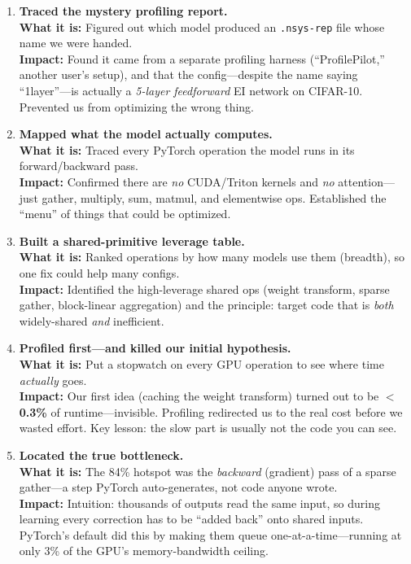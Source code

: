 \documentclass[11pt]{article}
\newcommand{\what}[1]{\textbf{What it is:} #1}
\newcommand{\impact}[1]{\textbf{Impact:} #1}
\begin{document}
\begin{enumerate}[leftmargin=*]

\item \textbf{Traced the mystery profiling report.}\\
\what{Figured out which model produced an \texttt{.nsys-rep} file whose name we were handed.}\\
\impact{Found it came from a separate profiling harness (``ProfilePilot,'' another user's
setup), and that the config---despite the name saying ``1layer''---is actually a
\emph{5-layer feedforward} EI network on CIFAR-10. Prevented us from optimizing the wrong thing.}

\item \textbf{Mapped what the model actually computes.}\\
\what{Traced every PyTorch operation the model runs in its forward/backward pass.}\\
\impact{Confirmed there are \emph{no} CUDA/Triton kernels and \emph{no} attention---just
gather, multiply, sum, matmul, and elementwise ops. Established the ``menu'' of things that
could be optimized.}

\item \textbf{Built a shared-primitive leverage table.}\\
\what{Ranked operations by how many models use them (breadth), so one fix could help many configs.}\\
\impact{Identified the high-leverage shared ops (weight transform, sparse gather, block-linear
aggregation) and the principle: target code that is \emph{both} widely-shared \emph{and}
inefficient.}

\item \textbf{Profiled first---and killed our initial hypothesis.}\\
\what{Put a stopwatch on every GPU operation to see where time \emph{actually} goes.}\\
\impact{Our first idea (caching the weight transform) turned out to be \textbf{$<$0.3\%} of
runtime---invisible. Profiling redirected us to the real cost before we wasted effort. Key
lesson: the slow part is usually not the code you can see.}

\item \textbf{Located the true bottleneck.}\\
\what{The 84\% hotspot was the \emph{backward} (gradient) pass of a sparse gather---a step
PyTorch auto-generates, not code anyone wrote.}\\
\impact{Intuition: thousands of outputs read the same input, so during learning every
correction has to be ``added back'' onto shared inputs. PyTorch's default did this by making
them queue one-at-a-time---running at only 3\% of the GPU's memory-bandwidth ceiling.}

\end{enumerate}
\end{document}
